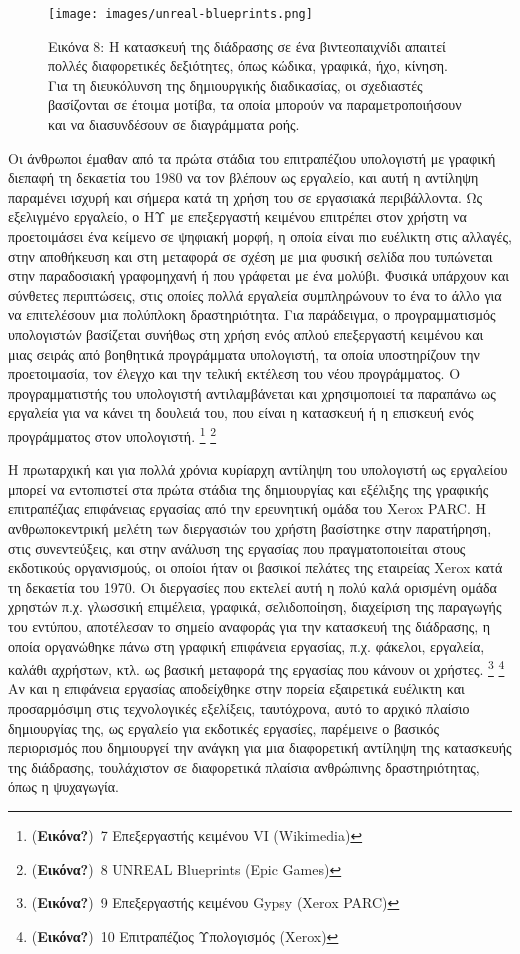 \documentclass[
]{article}
\begin{document}
\leavevmode{}%
\begin{figure}
\hypertarget{fig:unreal-blueprints}{%
\centering
\texttt{[image: images/unreal-blueprints.png]}
\caption{Εικόνα 8: Η κατασκευή της διάδρασης σε ένα βιντεοπαιχνίδι
απαιτεί πολλές διαφορετικές δεξιότητες, όπως κώδικα, γραφικά, ήχο,
κίνηση. Για τη διευκόλυνση της δημιουργικής διαδικασίας, οι σχεδιαστές
βασίζονται σε έτοιμα μοτίβα, τα οποία μπορούν να παραμετροποιήσουν και
να διασυνδέσουν σε διαγράμματα ροής.}\label{fig:unreal-blueprints}
}
\end{figure}

Οι άνθρωποι έμαθαν από τα πρώτα στάδια του επιτραπέζιου υπολογιστή με
γραφική διεπαφή τη δεκαετία του 1980 να τον βλέπουν ως εργαλείο, και
αυτή η αντίληψη παραμένει ισχυρή και σήμερα κατά τη χρήση του σε
εργασιακά περιβάλλοντα. Ως εξελιγμένο εργαλείο, ο ΗΥ με επεξεργαστή
κειμένου επιτρέπει στον χρήστη να προετοιμάσει ένα κείμενο σε ψηφιακή
μορφή, η οποία είναι πιο ευέλικτη στις αλλαγές, στην αποθήκευση και στη
μεταφορά σε σχέση με μια φυσική σελίδα που τυπώνεται στην παραδοσιακή
γραφομηχανή ή που γράφεται με ένα μολύβι. Φυσικά υπάρχουν και σύνθετες
περιπτώσεις, στις οποίες πολλά εργαλεία συμπληρώνουν το ένα το άλλο για
να επιτελέσουν μια πολύπλοκη δραστηριότητα. Για παράδειγμα, ο
προγραμματισμός υπολογιστών βασίζεται συνήθως στη χρήση ενός απλού
επεξεργαστή κειμένου και μιας σειράς από βοηθητικά προγράμματα
υπολογιστή, τα οποία υποστηρίζουν την προετοιμασία, τον έλεγχο και την
τελική εκτέλεση του νέου προγράμματος. Ο προγραμματιστής του υπολογιστή
αντιλαμβάνεται και χρησιμοποιεί τα παραπάνω ως εργαλεία για να κάνει τη
δουλειά του, που είναι η κατασκευή ή η επισκευή ενός προγράμματος στον
υπολογιστή. \footnote{(\textbf{Εικόνα?})~7 Επεξεργαστής κειμένου VI
  (Wikimedia)} \footnote{(\textbf{Εικόνα?})~8 UNREAL Blueprints (Epic
  Games)}

Η πρωταρχική και για πολλά χρόνια κυρίαρχη αντίληψη του υπολογιστή ως
εργαλείου μπορεί να εντοπιστεί στα πρώτα στάδια της δημιουργίας και
εξέλιξης της γραφικής επιτραπέζιας επιφάνειας εργασίας από την
ερευνητική ομάδα του Xerox PARC. Η ανθρωποκεντρική μελέτη των διεργασιών
του χρήστη βασίστηκε στην παρατήρηση, στις συνεντεύξεις, και στην
ανάλυση της εργασίας που πραγματοποιείται στους εκδοτικούς οργανισμούς,
οι οποίοι ήταν οι βασικοί πελάτες της εταιρείας Xerox κατά τη δεκαετία
του 1970. Οι διεργασίες που εκτελεί αυτή η πολύ καλά ορισμένη ομάδα
χρηστών π.χ. γλωσσική επιμέλεια, γραφικά, σελιδοποίηση, διαχείριση της
παραγωγής του εντύπου, αποτέλεσαν το σημείο αναφοράς για την κατασκευή
της διάδρασης, η οποία οργανώθηκε πάνω στη γραφική επιφάνεια εργασίας,
π.χ. φάκελοι, εργαλεία, καλάθι αχρήστων, κτλ. ως βασική μεταφορά της
εργασίας που κάνουν οι χρήστες. \footnote{(\textbf{Εικόνα?})~9
  Επεξεργαστής κειμένου Gypsy (Xerox PARC)} \footnote{(\textbf{Εικόνα?})~10
  Επιτραπέζιος Υπολογισμός (Xerox)} Αν και η επιφάνεια εργασίας
αποδείχθηκε στην πορεία εξαιρετικά ευέλικτη και προσαρμόσιμη στις
τεχνολογικές εξελίξεις, ταυτόχρονα, αυτό το αρχικό πλαίσιο δημιουργίας
της, ως εργαλείο για εκδοτικές εργασίες, παρέμεινε ο βασικός περιορισμός
που δημιουργεί την ανάγκη για μια διαφορετική αντίληψη της κατασκευής
της διάδρασης, τουλάχιστον σε διαφορετικά πλαίσια ανθρώπινης
δραστηριότητας, όπως η ψυχαγωγία.
\end{document}
